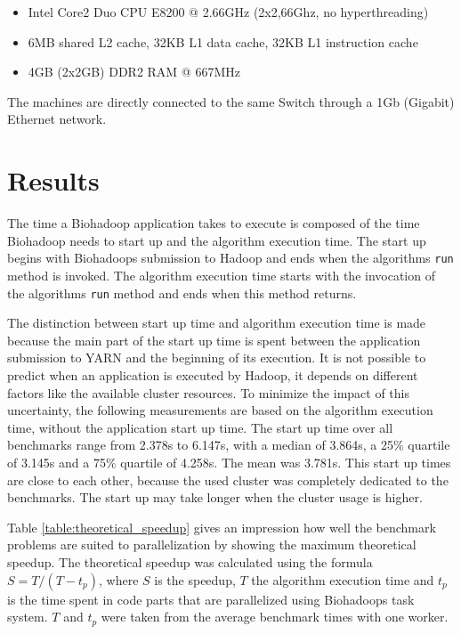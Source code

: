 \begin{itemize}
  \item Intel Core2 Duo CPU E8200 @ 2.66GHz (2x2,66Ghz, no hyperthreading)
  \item 6MB shared L2 cache, 32KB L1 data cache, 32KB L1 instruction cache
  \item 4GB (2x2GB) DDR2 RAM @ 667MHz
\end{itemize}

The machines are directly connected to the same Switch through a 1Gb (Gigabit) Ethernet network.

\section{Results}
\label{chap:evaluation:result}
The time a Biohadoop application takes to execute is composed of the time Biohadoop needs to start up and the algorithm execution time. The start up begins with Biohadoops submission to Hadoop and ends when the algorithms \texttt{run} method is invoked. The algorithm execution time starts with the invocation of the algorithms \texttt{run} method and ends when this method returns.

The distinction between start up time and algorithm execution time is made because the main part of the start up time is spent between the application submission to YARN and the beginning of its execution. It is not possible to predict when an application is executed by Hadoop, it depends on different factors like the available cluster resources. To minimize the impact of this uncertainty, the following measurements are based on the algorithm execution time, without the application start up time. The start up time over all benchmarks range from 2.378s to 6.147s, with a median of 3.864s, a 25\% quartile of 3.145s and a 75\% quartile of 4.258s. The mean was 3.781s. This start up times are close to each other, because the used cluster was completely dedicated to the benchmarks. The start up may take longer when the cluster usage is higher.

Table \ref{table:theoretical_speedup} gives an impression how well the benchmark problems are suited to parallelization by showing the maximum theoretical speedup. The theoretical speedup was calculated using the formula $S = T / (T - t_p)$, where $S$ is the speedup, $T$ the algorithm execution time and $t_p$ is the time spent in code parts that are parallelized using Biohadoops task system. $T$ and $t_p$ were taken from the average benchmark times with one worker.

